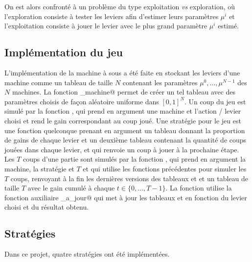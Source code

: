 \documentclass[a4paper,12pt]{article}
\begin{document}
On est alors confronté à un problème du type exploitation \emph{vs} exploration, où l'exploration consiste à tester les leviers afin d'estimer leurs paramètres $\mu^i$ et l'exploitation consiste à jouer le levier avec le plus grand paramètre $\mu^i$ estimé.

\subsection{Implémentation du jeu}
\label{SecImplementation}

L'implémentation de la machine à sous a été faite en stockant les leviers d'une machine comme un tableau de taille $N$ contenant les paramètres $\mu^0, \dots, \mu^{N-1}$ des $N$ machines. La fonction \verb@cree_machine@ permet de créer un tel tableau avec des paramètres choisis de façon aléatoire uniforme dans $[0, 1]^N$. Un coup du jeu est simulé par la fonction \verb@jouer@, qui prend en argument une machine et l'action / levier choisi et rend le gain correspondant au coup joué. Une stratégie pour le jeu est une fonction quelconque prenant en argument un tableau \verb@mu@ donnant la proportion de gains de chaque levier et un deuxième tableau \verb@Na@ contenant la quantité de coups jouées dans chaque levier, et qui renvoie un coup à jouer à la prochaine étape. Les $T$ coups d'une partie sont simulés par la fonction \verb@run@, qui prend en argument la machine, la stratégie et $T$ et qui utilise les fonctions précédentes pour simuler les $T$ coups, renvoyant à la fin les dernières versions des tableaux \verb@mu@ et \verb@Na@ et un tableau de taille $T$ avec le gain cumulé à chaque $t \in \{0, \dotsc, T-1\}$. La fonction \verb@run@ utilise la fonction auxiliaire \verb@mise_a_jour@ qui met à jour les tableaux \verb@mu@ et \verb@Na@ en fonction du levier choisi et du résultat obtenu.

\subsection{Stratégies}
\label{SecStrategies}

Dans ce projet, quatre stratégies ont été implémentées.
\end{document}
